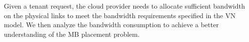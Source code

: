 \documentclass[review]{elsarticle}
\begin{document}

Given a tenant request, the cloud provider needs to allocate sufficient bandwidth on the physical links to meet the bandwidth requirements specified in the VN model. We then analyze the bandwidth consumption to achieve a better understanding of the MB placement problem. 
\end{document}
